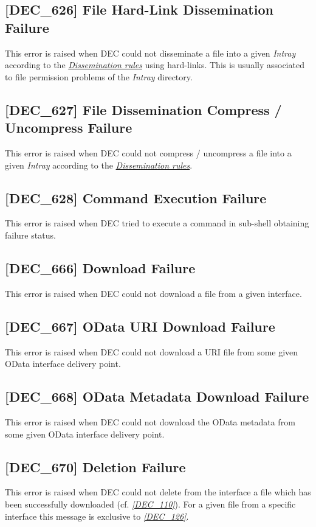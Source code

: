 \documentclass[dec_sum_main.tex]{subfiles}
\begin{document}
\subsection{[DEC\_626] File Hard-Link Dissemination Failure}
\label{DEC626}
This error is raised when DEC could not disseminate a file into a given \textit{Intray} according to the \hyperref[Dissemination rules]{\textit{Dissemination rules}} using hard-links. This is usually associated to file permission problems of the \textit{Intray} directory.

\subsection{[DEC\_627] File Dissemination Compress / Uncompress Failure}
\label{DEC627}
This error is raised when DEC could not compress / uncompress a file into a given \textit{Intray} according to the \hyperref[Dissemination rules]{\textit{Dissemination rules}}.

\subsection{[DEC\_628] Command Execution Failure}
\label{DEC628}
This error is raised when DEC tried to execute a command in sub-shell obtaining failure status.

\subsection{[DEC\_666] Download Failure}
\label{DEC666}
This error is raised when DEC could not download a file from a given interface.

\subsection{[DEC\_667] OData URI Download Failure}
\label{DEC667}
This error is raised when DEC could not download a URI file from some given OData interface delivery point.

\subsection{[DEC\_668] OData Metadata Download Failure}
\label{DEC668}
This error is raised when DEC could not download the OData metadata from some given OData interface delivery point.

\label{DEC670}
\subsection{[DEC\_670] Deletion Failure}
This error is raised when DEC could not delete from the interface a file which has been successfully downloaded (cf. \hyperref[DEC110]{\textit{[DEC\_110]}}).
For a given file from a specific interface this message is exclusive to \hyperref[DEC126]{\textit{[DEC\_126]}}.
\end{document}
